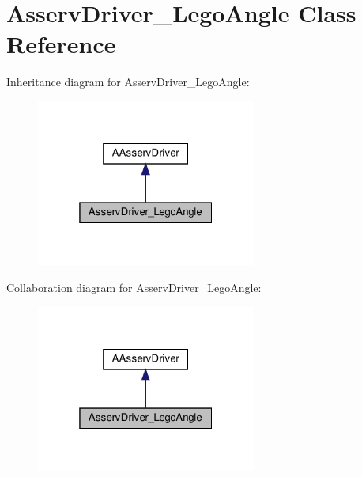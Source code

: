 \hypertarget{classAsservDriver__LegoAngle}{}\section{Asserv\+Driver\+\_\+\+Lego\+Angle Class Reference}
\label{classAsservDriver__LegoAngle}


Inheritance diagram for Asserv\+Driver\+\_\+\+Lego\+Angle\+:
\nopagebreak
\begin{figure}[H]
\begin{center}
\leavevmode
\includegraphics[width=205pt]{classAsservDriver__LegoAngle__inherit__graph}
\end{center}
\end{figure}


Collaboration diagram for Asserv\+Driver\+\_\+\+Lego\+Angle\+:
\nopagebreak
\begin{figure}[H]
\begin{center}
\leavevmode
\includegraphics[width=205pt]{classAsservDriver__LegoAngle__coll__graph}
\end{center}
\end{figure}
